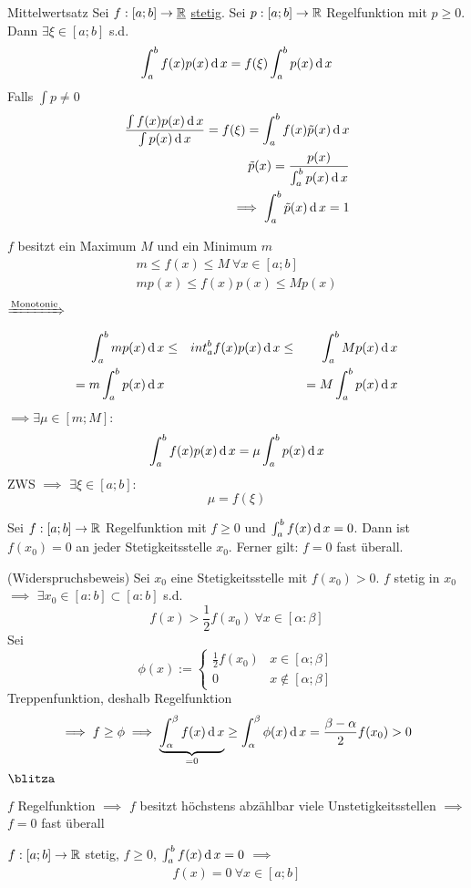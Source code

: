 \begin{Sat}{Mittelwertsatz}
  Sei $f:[a;b]\to \underline{\mathbb{R}}$ \underline{stetig}. Sei $p:[a;b]\to\mathbb{R}$ Regelfunktion mit $p\geq 0$. Dann $\exists \xi\in [a;b]$ s.d.
  \[\int^b_a f(x)p(x)\operatorname{d} x=f(\xi)\int^b_a p(x)\operatorname{d} x\]
  Falls $\int p \neq 0$
  \begin{align*}
    \frac{\int f(x)p(x)\operatorname{d} x}{\int p(x)\operatorname{d} x}=f(\xi)=\int^b_a f(x)\tilde{p}(x)\operatorname{d} x\\
    \tilde{p}(x)=\frac{p(x)}{\int^b_ap(x)\operatorname{d} x}\\
    \implies \int^b_a \tilde{p}(x) \operatorname{d} x=1
  \end{align*}
\end{Sat}
\begin{Bew}
  $f$ besitzt ein Maximum $M$ und ein Minimum $m$
  \begin{align*}
    m\leq f(x) \leq M\ \forall x\in [a;b]\\
    m p(x)\leq f(x)p(x)\leq M p(x)\\
  \end{align*}
  $\xRightarrow{\text{Monotonie}}$
  \begin{align*}
    \int^b_am p(x)\operatorname{d} x &\leq& int^b_a f(x)p(x)\operatorname{d} x &\leq& \int^b_a M p(x)\operatorname{d} x\\
    = m\int^b_ap(x)\operatorname{d} x & & & &=M \int^b_a p(x)\operatorname{d} x
  \end{align*}
  $\implies \exists \mu\in [m;M]$:
  \begin{align*}
    \int^b_af(x)p(x)\operatorname{d} x = \mu \int^b_a p(x) \operatorname{d} x    
  \end{align*}
  ZWS $\implies$ $\exists \xi \in [a;b]$:
  \[\mu=f(\xi)\]
\end{Bew}
\begin{Sat}
  Sei $f:[a;b]\to \mathbb{R}$ Regelfunktion mit $f\geq 0$ und $\int^b_af(x)\operatorname{d} x=0$. Dann ist $f(x_0)=0$ an jeder Stetigkeitsstelle $x_0$. Ferner gilt: $f=0$ fast überall.
\end{Sat}
\begin{Bew}{(Widerspruchsbeweis)}
  Sei $x_0$ eine Stetigkeitsstelle mit $f(x_0)>0$. $f$ stetig in $x_0$ $\implies$ $\exists x_0 \in [a:b]\subset[a:b]$ s.d.
  \[f(x)>\frac{1}{2}f(x_0)\ \forall x\in [\alpha:\beta]\]
  Sei
  \[\phi(x):=\begin{cases}
    \frac{1}{2}f(x_0)&x\in [\alpha;\beta]\\
    0 & x\not\in [\alpha;\beta]
  \end{cases}\]
  Treppenfunktion, deshalb Regelfunktion
  \[\implies f\geq \phi \implies \underbrace{\int^\beta_\alpha f(x)\operatorname{d} x}_{=0} \geq \int^\beta_\alpha\phi(x)\operatorname{d} x=\frac{\beta-\alpha}{2}f(x_0)>0\]
  $\blitza$
\end{Bew}
\begin{Sat}
  $f$ Regelfunktion $\implies$ $f$ besitzt höchstens abzählbar viele Unstetigkeitsstellen $\implies$ $f=0$ fast überall
\end{Sat}
\begin{Kor}
  $f:[a;b]\to\mathbb{R}$ stetig, $f\geq 0$, $\int_a^bf(x)\operatorname{d} x=0$ $\implies$
  \begin{align*}
    f(x)=0\ \forall x\in [a;b]    
  \end{align*}
\end{Kor}
